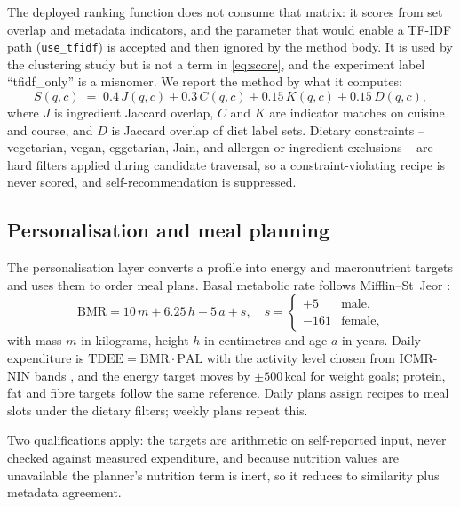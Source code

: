 \documentclass[conference]{IEEEtran}
\begin{document}
The deployed ranking function does not consume that matrix: it scores from set overlap and metadata indicators, and the parameter that would enable a TF-IDF path (\texttt{use\_tfidf}) is accepted and then ignored by the method body. It is used by the clustering study but is not a term in \eqref{eq:score}, and the experiment label ``tfidf\_only'' is a misnomer. We report the method by what it computes: \begin{equation} \label{eq:score} S(q,c) \;=\; 0.4\,J(q,c) + 0.3\,C(q,c) + 0.15\,K(q,c) + 0.15\,D(q,c), \end{equation} where $J$ is ingredient Jaccard overlap, $C$ and $K$ are indicator matches on cuisine and course, and $D$ is Jaccard overlap of diet label sets. Dietary constraints -- vegetarian, vegan, eggetarian, Jain, and allergen or ingredient exclusions -- are hard filters applied during candidate traversal, so a constraint-violating recipe is never scored, and self-recommendation is suppressed.

\subsection{Personalisation and meal planning} \label{sec:personal}

The personalisation layer converts a profile into energy and macronutrient targets and uses them to order meal plans. Basal metabolic rate follows Mifflin--St~Jeor \cite{mifflin1990}: \begin{equation} \label{eq:bmr} \mathrm{BMR} = 10\,m + 6.25\,h - 5\,a + s, \quad s = \begin{cases} +5 & \text{male},\\ -161 & \text{female},\end{cases} \end{equation} with mass $m$ in kilograms, height $h$ in centimetres and age $a$ in years. Daily expenditure is $\mathrm{TDEE} = \mathrm{BMR}\cdot \mathrm{PAL}$ with the activity level chosen from ICMR-NIN bands \cite{icmrnin2020}, and the energy target moves by $\pm 500$\,kcal for weight goals; protein, fat and fibre targets follow the same reference. Daily plans assign recipes to meal slots under the dietary filters; weekly plans repeat this.

Two qualifications apply: the targets are arithmetic on self-reported input, never checked against measured expenditure, and because nutrition values are unavailable the planner's nutrition term is inert, so it reduces to similarity plus metadata agreement.
\end{document}
